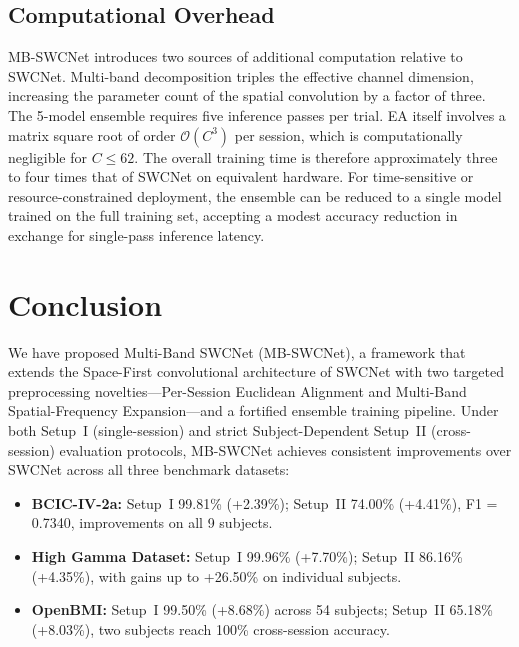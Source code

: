 \documentclass[conference]{IEEEtran}
\begin{document}
\subsection{Computational Overhead}

MB-SWCNet introduces two sources of additional computation relative to SWCNet. Multi-band decomposition triples the effective channel dimension, increasing the parameter count of the spatial convolution by a factor of three. The 5-model ensemble requires five inference passes per trial. EA itself involves a matrix square root of order $\mathcal{O}(C^3)$ per session, which is computationally negligible for $C \leq 62$. The overall training time is therefore approximately three to four times that of SWCNet on equivalent hardware. For time-sensitive or resource-constrained deployment, the ensemble can be reduced to a single model trained on the full training set, accepting a modest accuracy reduction in exchange for single-pass inference latency.

\section{Conclusion}

We have proposed Multi-Band SWCNet (MB-SWCNet), a framework that extends the Space-First convolutional architecture of SWCNet \cite{b1} with two targeted preprocessing novelties---Per-Session Euclidean Alignment and Multi-Band Spatial-Frequency Expansion---and a fortified ensemble training pipeline. Under both Setup~I (single-session) and strict Subject-Dependent Setup~II (cross-session) evaluation protocols, MB-SWCNet achieves consistent improvements over SWCNet \cite{b1} across all three benchmark datasets:

\begin{itemize}
    \item \textbf{BCIC-IV-2a:} Setup~I 99.81\% (+2.39\%); Setup~II 74.00\% (+4.41\%), F1 = 0.7340, improvements on all 9 subjects.
    \item \textbf{High Gamma Dataset:} Setup~I 99.96\% (+7.70\%); Setup~II 86.16\% (+4.35\%), with gains up to +26.50\% on individual subjects.
    \item \textbf{OpenBMI:} Setup~I 99.50\% (+8.68\%) across 54 subjects; Setup~II 65.18\% (+8.03\%), two subjects reach 100\% cross-session accuracy.
\end{itemize}
\end{document}
